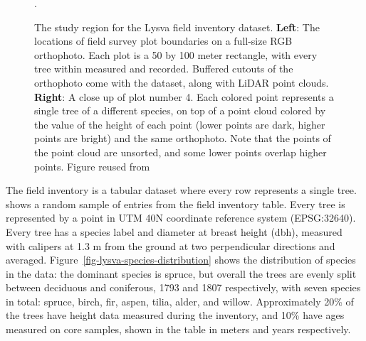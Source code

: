 \begin{figure}
\caption[The study region for the Lysva field inventory.]{\label{fig-lysva-roi}The study region for the Lysva field
inventory dataset. \textbf{Left}: The locations of field survey plot
boundaries on a full-size RGB orthophoto. Each plot is a 50 by 100 meter
rectangle, with every tree within measured and recorded. Buffered
cutouts of the orthophoto come with the dataset, along with LiDAR point
clouds. \textbf{Right}: A close up of plot number 4. Each colored point
represents a single tree of a different species, on top of a point cloud
colored by the value of the height of each point (lower points are dark,
higher points are bright) and the same orthophoto.
Note that the points of the point cloud are unsorted, and some lower points overlap higher points.
Figure reused from \citet{dubrovinOpenDatasetIndividual2024}}.
\end{figure}


The field inventory is a tabular dataset where every row represents a single tree.
\citet{tbl-inventory-example} shows a random sample of entries from the field inventory table.
Every tree is represented by a point in UTM 40N coordinate reference system (EPSG:32640).
Every tree has a species label and diameter at breast height (dbh), measured with calipers at 1.3 m from the ground at two perpendicular directions and averaged.
Figure~\ref{fig-lysva-species-distribution} shows the distribution of species in the data: the dominant species is spruce, but overall the trees are evenly split between deciduous and coniferous, 1793 and 1807 respectively, with seven species in total: spruce, birch, fir, aspen, tilia, alder, and willow.
Approximately 20\% of the trees have height data measured during the inventory, and 10\% have ages measured on core samples, shown in the table in meters and years respectively.


